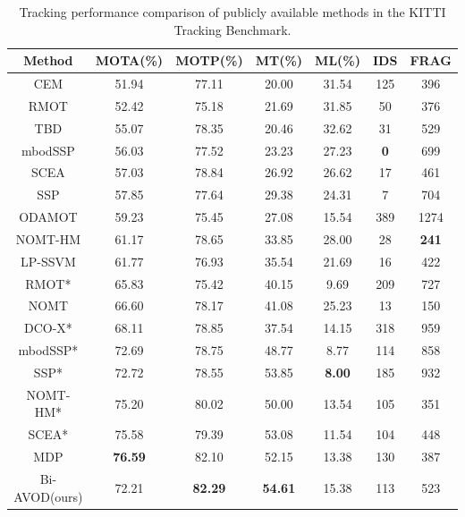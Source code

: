 \documentclass{bmvc2k}
\begin{document}
\begin{table}\centering
	\footnotesize
	\begin{tabular}{ccccccc}
		\toprule[1.5pt]
		Method        & MOTA(\%) & MOTP(\%) & MT(\%) & ML(\%) & IDS & FRAG \\ \midrule
		CEM\cite{Milan2014PAMI}           & 51.94    & 77.11    & 20.00  & 31.54  & 125 & 396  \\
				RMOT\cite{Yoon2015WACV}          & 52.42    & 75.18    & 21.69  & 31.85  & 50  & 376  \\
				TBD\cite{Geiger2014PAMI}           & 55.07    & 78.35    & 20.46  & 32.62  & 31  & 529  \\
				mbodSSP\cite{Lenz2015ICCV}        & 56.03    & 77.52    & 23.23  & 27.23  & \textbf{0}   & 699  \\
				SCEA\cite{Yoon2016CVPR}          & 57.03    & 78.84    & 26.92  & 26.62  & 17  & 461  \\
				SSP\cite{Lenz2015ICCV}            & 57.85    & 77.64    & 29.38  & 24.31  & 7   & 704  \\
				ODAMOT\cite{Gaidon2015BMVC}        & 59.23    & 75.45    & 27.08  & 15.54  & 389 & 1274 \\
				NOMT-HM\cite{Choi2015ICCV}       & 61.17    & 78.65    & 33.85  & 28.00  & 28  & \textbf{241}  \\
				LP-SSVM\cite{Wang2016IJCV}       & 61.77    & 76.93    & 35.54  & 21.69  & 16  & 422  \\
				RMOT*\cite{Yoon2015WACV}         & 65.83    & 75.42    & 40.15  & 9.69   & 209 & 727  \\
				NOMT\cite{Choi2015ICCV}          & 66.60    & 78.17    & 41.08  & 25.23  & 13  & 150  \\
				DCO-X*\cite{Milan2013CVPR}        & 68.11    & 78.85    & 37.54  & 14.15  & 318 & 959  \\
				mbodSSP*\cite{Lenz2015ICCV}       & 72.69    & 78.75    & 48.77  & 8.77   & 114 & 858  \\
				SSP*\cite{Lenz2015ICCV}           & 72.72    & 78.55    & 53.85  & \textbf{8.00}   & 185 & 932  \\
				NOMT-HM*\cite{Choi2015ICCV}      & 75.20    & 80.02    & 50.00  & 13.54  & 105 & 351  \\
				SCEA*\cite{Yoon2016CVPR}         & 75.58    & 79.39    & 53.08  & 11.54  & 104 & 448  \\
				MDP\cite{xiang2017subcategory}   & \textbf{76.59}    & 82.10    & 52.15  & 13.38  & 130 & 387   \\ \midrule 
		Bi-AVOD(ours) & 72.21    & \textbf{82.29}    & \textbf{54.61}  & 15.38   & 113 & 523  \\ 
		\bottomrule[1.5pt]
	\end{tabular}
	\setlength{\abovecaptionskip}{1pt}
	\caption{Tracking performance comparison of publicly available methods in the KITTI Tracking Benchmark.}
	\label{label:result_kitti}
	\vspace{-0.2cm}
\end{table}
\end{document}
